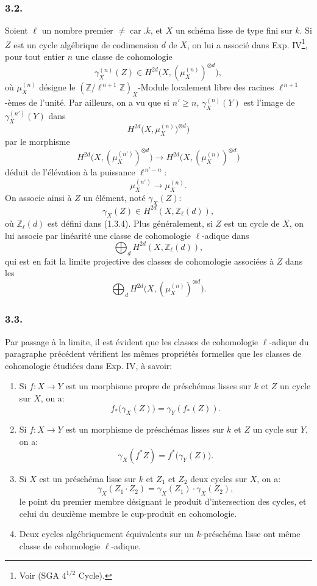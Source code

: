 \documentclass[11pt]{article}
\newcommand{\car}{\operatorname{car}}
\providecommand{\car}{\operatorname{car}}
\providecommand{\car}{\operatorname{car}}
\providecommand{\car}{\operatorname{car}}
\begin{document}
\subsubsection*{3.2.}
Soient \(\ell\) un nombre premier \(\ne\car.k\), et \(X\) un schéma lisse de type fini sur \(k\). Si \(Z\) est un cycle algébrique de codimension \(d\) de \(X\), on lui a associé dans Exp. IV\footnote{Voir (SGA \(4^{1/2}\) Cycle).}, pour tout entier \(n\) une classe de cohomologie
\[
\gamma_X^{(n)}(Z)\in H^{2d}\bigl(X,(\mu_X^{(n)})^{\otimes d}\bigr),
\]
où \(\mu_X^{(n)}\) désigne le \((\mathbb Z/\ell^{\,n+1}\mathbb Z)_X\)-Module localement libre des racines \(\ell^{\,n+1}\)-èmes de l'unité. Par ailleurs, on a vu que si \(n'\ge n\), \(\gamma_X^{(n)}(Y)\) est l'image de \(\gamma_X^{(n')}(Y)\) dans
\[
H^{2d}\bigl(X,\mu_X^{(n)})^{\otimes d}\bigr)
\]
par le morphisme
\[
H^{2d}\bigl(X,(\mu_X^{(n')})^{\otimes d}\bigr)
\longrightarrow
H^{2d}\bigl(X,(\mu_X^{(n)})^{\otimes d}\bigr)
\]
déduit de l'élévation à la puissance \(\ell^{\,n'-n}\):
\[
\mu_X^{(n')}\longrightarrow \mu_X^{(n)}.
\]
On associe ainsi à \(Z\) un élément, noté \(\gamma_X(Z)\):
\[
\gamma_X(Z)\in H^{2d}(X,\mathbb Z_\ell(d)),
\]
où \(\mathbb Z_\ell(d)\) est défini dans (1.3.4). Plus généralement, si \(Z\) est un cycle de \(X\), on lui associe par linéarité une classe de cohomologie \(\ell\)-adique dans
\[
\bigoplus_d H^{2d}(X,\mathbb Z_\ell(d)),
\]
qui est en fait la limite projective des classes de cohomologie associées à \(Z\) dans les
\[
\bigoplus_d H^{2d}\bigl(X,(\mu_X^{(n)})^{\otimes d}\bigr).
\]

\subsubsection*{3.3.}
Par passage à la limite, il est évident que les classes de cohomologie \(\ell\)-adique du paragraphe précédent vérifient les mêmes propriétés formelles que les classes de cohomologie étudiées dans Exp. IV, à savoir:

\begin{enumerate}[label=(\roman*)]
\item Si \(f:X\to Y\) est un morphisme propre de préschémas lisses sur \(k\) et \(Z\) un cycle sur \(X\), on a:
\[
f_*\bigl(\gamma_X(Z)\bigr)=\gamma_Y(f_*(Z)).
\tag{*}
\]

\item Si \(f:X\to Y\) est un
morphisme de préschémas lisses sur \(k\) et \(Z\) un cycle sur \(Y\), on a:
\[
\gamma_X(f^*Z)=f^*\bigl(\gamma_Y(Z)\bigr).
\tag{**}
\]

\item Si \(X\) est un préschéma lisse sur \(k\) et \(Z_1\) et \(Z_2\) deux cycles sur \(X\), on a:
\[
\gamma_X(Z_1\cdot Z_2)=\gamma_X(Z_1)\cdot \gamma_X(Z_2),
\tag{**}
\]
le point du premier membre désignant le produit d'intersection des cycles, et celui du deuxième membre le cup-produit en cohomologie.

\item Deux cycles algébriquement équivalents sur un \(k\)-préschéma lisse ont même classe de cohomologie \(\ell\)-adique.
\end{enumerate}
\end{document}
